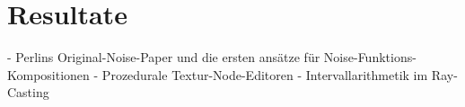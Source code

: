 \chapter{Resultate}
- Perlins Original-Noise-Paper und die ersten ansätze für Noise-Funktions-Kompositionen
- Prozedurale Textur-Node-Editoren
- Intervallarithmetik im Ray-Casting
